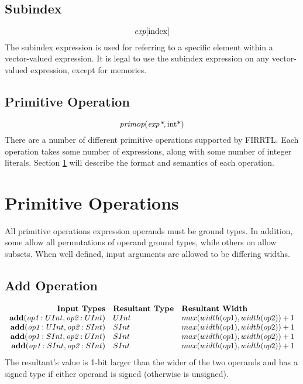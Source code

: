 \documentclass[12pt]{article}
\begin{document}
\subsection{Subindex}
\[
\text{\em exp}[\text{index}]
\]
The subindex expression is used for referring to a specific element within a vector-valued expression.
It is legal to use the subindex expression on any vector-valued expression, except for memories. 

\subsection{Primitive Operation}
\[
\text{\em primop}(\text{\em exp*}, \text{int}\text{*})
\]
There are a number of different primitive operations supported by FIRRTL. 
Each operation takes some number of expressions, along with some number of integer literals.
Section \ref{primitives} will describe the format and semantics of each operation.


\section{Primitive Operations} \label{primitives}

All primitive operations expression operands must be ground types.
In addition, some allow all permutations of operand ground types, while others on allow subsets.
When well defined, input arguments are allowed to be differing widths.

\subsection{Add Operation}
\[
\begin{array}{rll}
\text{\bf Input Types} & \text{\bf Resultant Type} & \text{\bf Resultant Width} \\
\text{\bf add}(\text{\em op1}:UInt, \text{\em op2}:UInt) & UInt & max(width(op1),width(op2)) + 1 \\
\text{\bf add}(\text{\em op1}:UInt, \text{\em op2}:SInt) & SInt & max(width(op1),width(op2)) + 1 \\
\text{\bf add}(\text{\em op1}:SInt, \text{\em op2}:UInt) & SInt & max(width(op1),width(op2)) + 1 \\
\text{\bf add}(\text{\em op1}:SInt, \text{\em op2}:SInt) & SInt & max(width(op1),width(op2)) + 1 \\
\end{array}
\]
The resultant's value is 1-bit larger than the wider of the two operands and has a signed type if either operand is signed (otherwise is unsigned).
\end{document}
